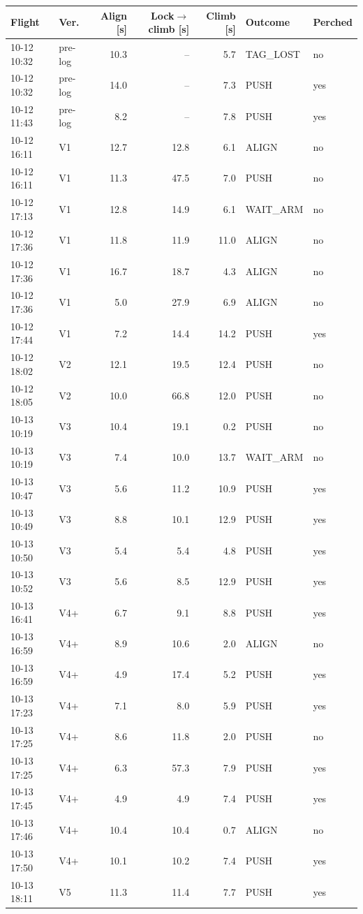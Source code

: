 \begin{tabular}{llrrrll}
\toprule
Flight & Ver. & Align [s] & Lock$\to$climb [s] & Climb [s] & Outcome & Perched \\
\midrule
10-12 10:32 & pre-log & 10.3 & -- & 5.7 & TAG\_LOST & no \\
10-12 10:32 & pre-log & 14.0 & -- & 7.3 & PUSH & yes \\
10-12 11:43 & pre-log & 8.2 & -- & 7.8 & PUSH & yes \\
10-12 16:11 & V1 & 12.7 & 12.8 & 6.1 & ALIGN & no \\
10-12 16:11 & V1 & 11.3 & 47.5 & 7.0 & PUSH & no \\
10-12 17:13 & V1 & 12.8 & 14.9 & 6.1 & WAIT\_ARM & no \\
10-12 17:36 & V1 & 11.8 & 11.9 & 11.0 & ALIGN & no \\
10-12 17:36 & V1 & 16.7 & 18.7 & 4.3 & ALIGN & no \\
10-12 17:36 & V1 & 5.0 & 27.9 & 6.9 & ALIGN & no \\
10-12 17:44 & V1 & 7.2 & 14.4 & 14.2 & PUSH & yes \\
10-12 18:02 & V2 & 12.1 & 19.5 & 12.4 & PUSH & no \\
10-12 18:05 & V2 & 10.0 & 66.8 & 12.0 & PUSH & no \\
10-13 10:19 & V3 & 10.4 & 19.1 & 0.2 & PUSH & no \\
10-13 10:19 & V3 & 7.4 & 10.0 & 13.7 & WAIT\_ARM & no \\
10-13 10:47 & V3 & 5.6 & 11.2 & 10.9 & PUSH & yes \\
10-13 10:49 & V3 & 8.8 & 10.1 & 12.9 & PUSH & yes \\
10-13 10:50 & V3 & 5.4 & 5.4 & 4.8 & PUSH & yes \\
10-13 10:52 & V3 & 5.6 & 8.5 & 12.9 & PUSH & yes \\
10-13 16:41 & V4+ & 6.7 & 9.1 & 8.8 & PUSH & yes \\
10-13 16:59 & V4+ & 8.9 & 10.6 & 2.0 & ALIGN & no \\
10-13 16:59 & V4+ & 4.9 & 17.4 & 5.2 & PUSH & yes \\
10-13 17:23 & V4+ & 7.1 & 8.0 & 5.9 & PUSH & yes \\
10-13 17:25 & V4+ & 8.6 & 11.8 & 2.0 & PUSH & no \\
10-13 17:25 & V4+ & 6.3 & 57.3 & 7.9 & PUSH & yes \\
10-13 17:45 & V4+ & 4.9 & 4.9 & 7.4 & PUSH & yes \\
10-13 17:46 & V4+ & 10.4 & 10.4 & 0.7 & ALIGN & no \\
10-13 17:50 & V4+ & 10.1 & 10.2 & 7.4 & PUSH & yes \\
10-13 18:11 & V5 & 11.3 & 11.4 & 7.7 & PUSH & yes \\
\bottomrule
\end{tabular}
